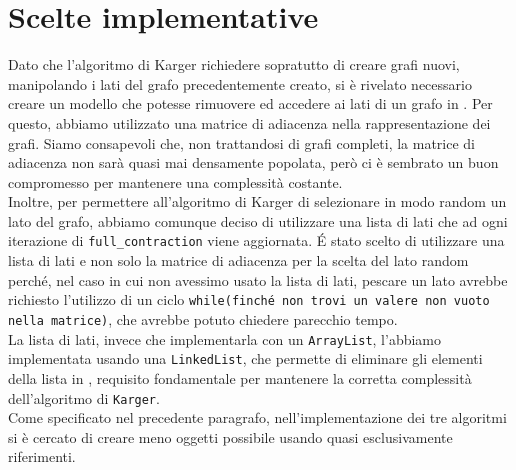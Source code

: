 \section{Scelte implementative}
Dato che l'algoritmo di Karger richiedere sopratutto di creare grafi nuovi, manipolando i lati del grafo precedentemente creato, si è rivelato necessario creare un modello che potesse rimuovere ed accedere ai lati di un grafo in . Per questo, abbiamo utilizzato una matrice di adiacenza nella rappresentazione dei grafi. Siamo consapevoli che, non trattandosi di grafi completi, la matrice di adiacenza non sarà quasi mai densamente popolata, però ci è sembrato un buon compromesso per mantenere una complessità costante.\\
Inoltre, per permettere all'algoritmo di Karger di selezionare in modo random un lato del grafo, abbiamo comunque deciso di utilizzare una lista di lati che ad ogni iterazione di \texttt{full\_contraction} viene aggiornata. \'E stato scelto di utilizzare una lista di lati e non solo la matrice di adiacenza per la scelta del lato random perché, nel caso in cui non avessimo usato la lista di lati, pescare un lato avrebbe richiesto l'utilizzo di un ciclo \texttt{while(finché non trovi un valere non vuoto nella matrice)}, che avrebbe potuto chiedere parecchio tempo.\\
La lista di lati, invece che implementarla con un \texttt{ArrayList}, l'abbiamo implementata usando una \texttt{LinkedList}, che permette di eliminare gli elementi della lista in , requisito fondamentale per mantenere la corretta complessità dell'algoritmo di \texttt{Karger}.\\ 
Come specificato nel precedente paragrafo, nell'implementazione dei tre algoritmi si è cercato di creare meno oggetti possibile usando quasi esclusivamente riferimenti. 

